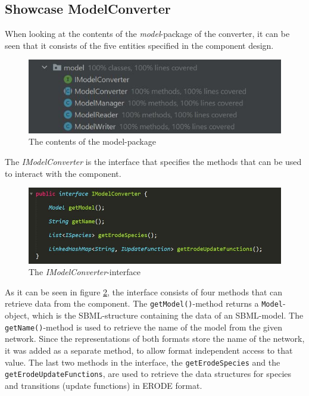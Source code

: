 \subsection{Showcase ModelConverter}
When looking at the contents of the \emph{model}-package of the converter, it can be seen that it consists of the five entities specified in the component design.
\begin{figure}[H]
    \centering
    \includegraphics{Sections/Images/ModelConverter.JPG}
    \caption{The contents of the model-package}
    \label{fig:modelConverter}
\end{figure}
The \emph{IModelConverter} is the interface that specifies the methods that can be used to interact with the component.
\begin{figure}[H]
    \centering
    \includegraphics[scale=0.8]{Sections/Images/ModelInterface.JPG}
    \caption{The \emph{IModelConverter}-interface}
    \label{fig:modelInterface}
\end{figure}

As it can be seen in figure \ref{fig:modelInterface}, the interface consists of four methods that can retrieve data from the component. The \texttt{getModel()}-method returns a \texttt{Model}-object, which is the SBML-structure containing the data of an SBML-model. The \texttt{getName()}-method is used to retrieve the name of the model from the given network. Since the representations of both formats store the name of the network, it was added as a separate method, to allow format independent access to that value. The last two methods in the interface, the \texttt{getErodeSpecies} and the \texttt{getErodeUpdateFunctions}, are used to retrieve the data structures for species and transitions (update functions) in ERODE format.

